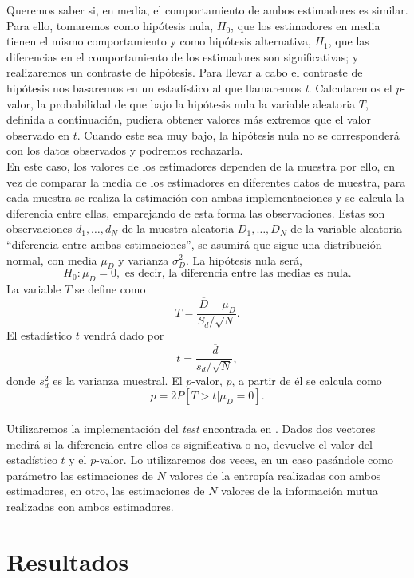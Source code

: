 \documentclass[12pt,a4paper]{report} %
\newcommand{\olsi}[1]{\,\overline{\!{#1}}} %
\theoremstyle{definition}
\begin{document}
Queremos saber si, en media, el comportamiento de ambos estimadores es similar. Para ello, tomaremos como hipótesis nula, $H_0$, que los estimadores en media tienen el mismo comportamiento y como hipótesis alternativa, $H_1$, que las diferencias en el comportamiento de los estimadores son significativas; y realizaremos un contraste de hipótesis. Para llevar a cabo el contraste de hipótesis nos basaremos en un estadístico al que llamaremos \textit{t}. Calcularemos el $p$-valor, la probabilidad de que bajo la hipótesis nula la variable aleatoria $T$, definida a continuación, pudiera obtener valores más extremos que el valor observado en $t$. Cuando este sea muy bajo, la hipótesis nula no se corresponderá con los datos observados y podremos rechazarla.\\

En este caso, los valores de los estimadores dependen de la muestra por ello, en vez de comparar la media de los estimadores en diferentes datos de muestra, para cada muestra se realiza la estimación con ambas implementaciones y se calcula la diferencia entre ellas, emparejando de esta forma las observaciones. Estas son observaciones $d_1,\dots,d_N$ de la muestra aleatoria $D_1,\dots, D_N$ de la variable aleatoria ``diferencia entre ambas estimaciones'', se asumirá que sigue una distribución normal, con media $\mu_D$ y varianza $\sigma^2_D$. La hipótesis nula será,\[
H_0: \mu_D = 0,\text{ es decir, la diferencia entre las medias es nula}.
\]
La variable $T$ se define como\[
T = \frac{\olsi{D} - \mu_D}{S_d/\sqrt{N}}.
\]
El estadístico $t$ vendrá dado por\[
t = \frac{\olsi{d}}{s_d/\sqrt{N}},
\]
donde $s^2_d$ es la varianza muestral. El $p$-valor, $p$, a partir de él se calcula como \[
p = 2 P \left [ T > t | \mu_D = 0 \right ]. 
\]\\[-10pt]

Utilizaremos la implementación del \textit{test} encontrada en \cite{ttest}. Dados dos vectores medirá si la diferencia entre ellos es significativa o no, devuelve el valor del estadístico $t$ y el $p$-valor. Lo utilizaremos dos veces, en un caso pasándole como parámetro las estimaciones de $N$ valores de la entropía realizadas con ambos estimadores, en otro, las estimaciones de $N$ valores de la información  mutua realizadas con ambos estimadores.\\

\chapter{Resultados}
\end{document}
